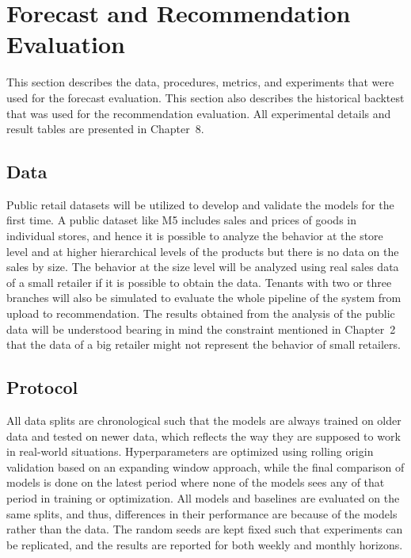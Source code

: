 \documentclass{StockSense}
\begin{document}
\section{Forecast and Recommendation Evaluation}
\label{sec:evaluation}

This section describes the data, procedures, metrics, and experiments that were used for the forecast evaluation. This section also describes the historical backtest that was used for the recommendation evaluation. All experimental details and result tables are presented in Chapter~8.

\subsection{Data}

Public retail datasets will be utilized to develop and validate the models for the first time. A public dataset like M5 includes sales and prices of goods in individual stores, and hence it is possible to analyze the behavior at the store level and at higher hierarchical levels of the products but there is no data on the sales by size. The behavior at the size level will be analyzed using real sales data of a small retailer if it is possible to obtain the data. Tenants with two or three branches will also be simulated to evaluate the whole pipeline of the system from upload to recommendation. The results obtained from the analysis of the public data will be understood bearing in mind the constraint mentioned in Chapter~2 that the data of a big retailer might not represent the behavior of small retailers.

\subsection{Protocol}

All data splits are chronological such that the models are always trained on older data and tested on newer data, which reflects the way they are supposed to work in real-world situations. Hyperparameters are optimized using rolling origin validation based on an expanding window approach, while the final comparison of models is done on the latest period where none of the models sees any of that period in training or optimization. All models and baselines are evaluated on the same splits, and thus, differences in their performance are because of the models rather than the data. The random seeds are kept fixed such that experiments can be replicated, and the results are reported for both weekly and monthly horizons.
\end{document}
